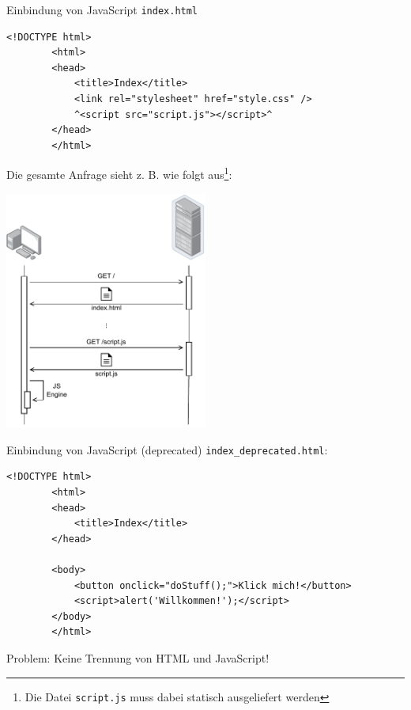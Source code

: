 \begin{example}{Einbindung von JavaScript}
    \texttt{index.html}
    \begin{lstlisting}[language=HTML5]
        <!DOCTYPE html>
        <html>
        <head>
            <title>Index</title>
            <link rel="stylesheet" href="style.css" />
            ^<script src="script.js"></script>^
        </head>
        </html>
    \end{lstlisting}

    Die gesamte Anfrage sieht z. B. wie folgt aus\footnote{Die Datei \texttt{script.js} muss dabei statisch ausgeliefert werden}:

    \begin{center}
        \includegraphics[width=0.50\textwidth]{includes/figures/defi_client_js.pdf}
    \end{center}
\end{example}

\begin{example}{Einbindung von JavaScript (deprecated)}
    \texttt{index\_deprecated.html}:

    \begin{lstlisting}[language=HTML5]
        <!DOCTYPE html>
        <html>
        <head>
            <title>Index</title>
        </head>

        <body>
            <button onclick="doStuff();">Klick mich!</button>
            <script>alert('Willkommen!');</script>
        </body>
        </html>
    \end{lstlisting}

    Problem: Keine Trennung von HTML und JavaScript!
\end{example}

